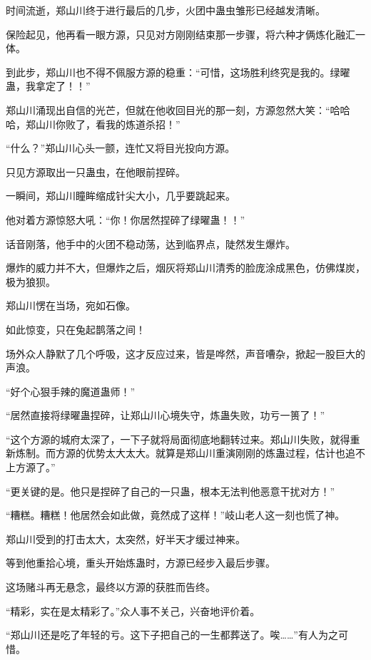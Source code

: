 
\begin{this_body}

时间流逝，郑山川终于进行最后的几步，火团中蛊虫雏形已经越发清晰。

保险起见，他再看一眼方源，只见对方刚刚结束那一步骤，将六种才俩炼化融汇一体。

到此步，郑山川也不得不佩服方源的稳重：“可惜，这场胜利终究是我的。绿曜蛊，我拿定了！！”

郑山川涌现出自信的光芒，但就在他收回目光的那一刻，方源忽然大笑：“哈哈哈，郑山川你败了，看我的炼道杀招！”

“什么？”郑山川心头一颤，连忙又将目光投向方源。

只见方源取出一只蛊虫，在他眼前捏碎。

一瞬间，郑山川瞳眸缩成针尖大小，几乎要跳起来。

他对着方源惊怒大吼：“你！你居然捏碎了绿曜蛊！！”

话音刚落，他手中的火团不稳动荡，达到临界点，陡然发生爆炸。

爆炸的威力并不大，但爆炸之后，烟灰将郑山川清秀的脸庞涂成黑色，仿佛煤炭，极为狼狈。

郑山川愣在当场，宛如石像。

如此惊变，只在兔起鹊落之间！

场外众人静默了几个呼吸，这才反应过来，皆是哗然，声音嘈杂，掀起一股巨大的声浪。

“好个心狠手辣的魔道蛊师！”

“居然直接将绿曜蛊捏碎，让郑山川心境失守，炼蛊失败，功亏一篑了！”

“这个方源的城府太深了，一下子就将局面彻底地翻转过来。郑山川失败，就得重新炼制。而方源的优势太大太大。就算是郑山川重演刚刚的炼蛊过程，估计也追不上方源了。”

“更关键的是。他只是捏碎了自己的一只蛊，根本无法判他恶意干扰对方！”

“糟糕。糟糕！他居然会如此做，竟然成了这样！”岐山老人这一刻也慌了神。

郑山川受到的打击太大，太突然，好半天才缓过神来。

等到他重拾心境，重头开始炼蛊时，方源已经步入最后步骤。

这场赌斗再无悬念，最终以方源的获胜而告终。

“精彩，实在是太精彩了。”众人事不关己，兴奋地评价着。

“郑山川还是吃了年轻的亏。这下子把自己的一生都葬送了。唉……”有人为之可惜。


\end{this_body}
